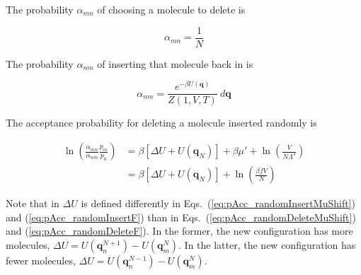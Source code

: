\noindent
The probability $\alpha_{mn}$ of choosing a molecule to delete is

\begin{equation}
\alpha_{mn} = \frac{1}{N}
\end{equation}

\noindent
The probability $\alpha_{nm}$ of inserting that molecule back in is

\begin{equation}
\alpha_{nm} = \frac{e^{-\beta U(\mathbf{q})}}{Z(1,V,T)}\ d\mathbf{q}
\end{equation}

\noindent
The acceptance probability for deleting a molecule inserted randomly is

\begin{align}
\label{eq:pAcc_randomDeleteMuShift}
\ln\left( \frac{\alpha_{mn}}{\alpha_{nm}} \frac{p_m}{p_n} \right) &= \beta \left[\Delta U + U(\mathbf{q}_{N})\right] + \beta \mu' + \ln\left( \frac{V}{N\Lambda^3} \right) \\
\label{eq:pAcc_randomDeleteF}
&= \beta \left[\Delta U + U(\mathbf{q}_{N})\right] + \ln\left( \frac{\beta f V}{N} \right)
\end{align}

Note that in $\Delta U$ is defined differently in Eqs.\ (\ref{eq:pAcc_randomInsertMuShift}) and (\ref{eq:pAcc_randomInsertF}) than in Eqs.\ (\ref{eq:pAcc_randomDeleteMuShift}) and (\ref{eq:pAcc_randomDeleteF}). In the former, the new configuration has more molecules, $\Delta U = U(\mathbf{q}_n^{N+1}) - U(\mathbf{q}_m^N)$. In the latter, the new configuration has fewer molecules, $\Delta U = U(\mathbf{q}_n^{N-1}) - U(\mathbf{q}_m^N)$.
